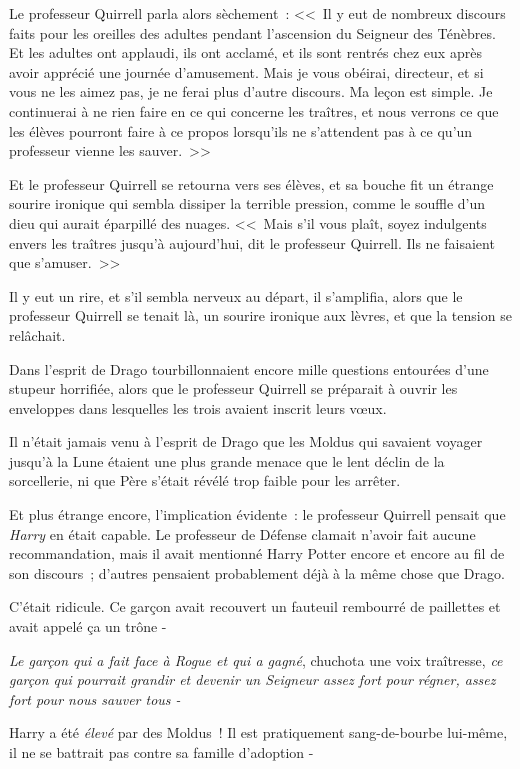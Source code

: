 Le professeur Quirrell parla alors sèchement~: <<~Il y eut de nombreux discours faits pour les oreilles des adultes pendant l'ascension du Seigneur des Ténèbres. Et les adultes ont applaudi, ils ont acclamé, et ils sont rentrés chez eux après avoir apprécié une journée d'amusement. Mais je vous obéirai, directeur, et si vous ne les aimez pas, je ne ferai plus d'autre discours. Ma leçon est simple. Je continuerai à ne rien faire en ce qui concerne les traîtres, et nous verrons ce que les élèves pourront faire à ce propos lorsqu'ils ne s'attendent pas à ce qu'un professeur vienne les sauver.~>>

Et le professeur Quirrell se retourna vers ses élèves, et sa bouche fit un étrange sourire ironique qui sembla dissiper la terrible pression, comme le souffle d'un dieu qui aurait éparpillé des nuages. <<~Mais s'il vous plaît, soyez indulgents envers les traîtres jusqu'à aujourd'hui, dit le professeur Quirrell. Ils ne faisaient que s'amuser.~>>

Il y eut un rire, et s'il sembla nerveux au départ, il s'amplifia, alors que le professeur Quirrell se tenait là, un sourire ironique aux lèvres, et que la tension se relâchait.

\later

Dans l'esprit de Drago tourbillonnaient encore mille questions entourées d'une stupeur horrifiée, alors que le professeur Quirrell se préparait à ouvrir les enveloppes dans lesquelles les trois avaient inscrit leurs vœux.

Il n'était jamais venu à l'esprit de Drago que les Moldus qui savaient voyager jusqu'à la Lune étaient une plus grande menace que le lent déclin de la sorcellerie, ni que Père s'était révélé trop faible pour les arrêter.

Et plus étrange encore, l'implication évidente~: le professeur Quirrell pensait que \emph{Harry} en était capable. Le professeur de Défense clamait n'avoir fait aucune recommandation, mais il avait mentionné Harry Potter encore et encore au fil de son discours~; d'autres pensaient probablement déjà à la même chose que Drago.

C'était ridicule. Ce garçon avait recouvert un fauteuil rembourré de paillettes et avait appelé ça un trône -

\emph{Le garçon qui a fait face à Rogue et qui a gagné}, chuchota une voix traîtresse, \emph{ce garçon qui pourrait grandir et devenir un Seigneur assez fort pour régner, assez fort pour nous sauver tous -}

Harry a été \emph{élevé} par des Moldus~! Il est pratiquement sang-de-bourbe lui-même, il ne se battrait pas contre sa famille d'adoption -

